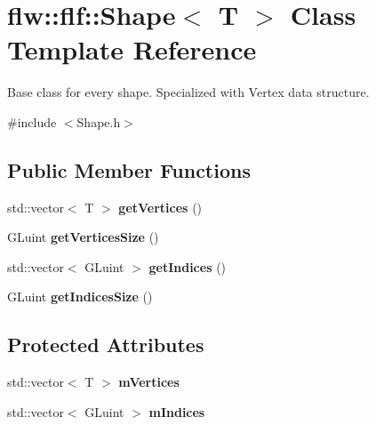 \hypertarget{classflw_1_1flf_1_1Shape}{}\section{flw\+:\+:flf\+:\+:Shape$<$ T $>$ Class Template Reference}
\label{classflw_1_1flf_1_1Shape}


Base class for every shape. Specialized with Vertex data structure.  




{\ttfamily \#include $<$Shape.\+h$>$}

\subsection*{Public Member Functions}
\begin{DoxyCompactItemize}
\item 
std\+::vector$<$ T $>$ {\bfseries get\+Vertices} ()\hypertarget{classflw_1_1flf_1_1Shape_a0cd6cc27bdc9ccd786413a6b76ffe7ba}{}\label{classflw_1_1flf_1_1Shape_a0cd6cc27bdc9ccd786413a6b76ffe7ba}

\item 
G\+Luint {\bfseries get\+Vertices\+Size} ()\hypertarget{classflw_1_1flf_1_1Shape_a787f47ca487ec7de0442209992f748f1}{}\label{classflw_1_1flf_1_1Shape_a787f47ca487ec7de0442209992f748f1}

\item 
std\+::vector$<$ G\+Luint $>$ {\bfseries get\+Indices} ()\hypertarget{classflw_1_1flf_1_1Shape_a42b437a6e28b9a5d795a0cd478071720}{}\label{classflw_1_1flf_1_1Shape_a42b437a6e28b9a5d795a0cd478071720}

\item 
G\+Luint {\bfseries get\+Indices\+Size} ()\hypertarget{classflw_1_1flf_1_1Shape_a4df4a07e5802c88c770c427b6fc1bd46}{}\label{classflw_1_1flf_1_1Shape_a4df4a07e5802c88c770c427b6fc1bd46}

\end{DoxyCompactItemize}
\subsection*{Protected Attributes}
\begin{DoxyCompactItemize}
\item 
std\+::vector$<$ T $>$ {\bfseries m\+Vertices}\hypertarget{classflw_1_1flf_1_1Shape_ac44a4ee206337c5959292c264a748d2d}{}\label{classflw_1_1flf_1_1Shape_ac44a4ee206337c5959292c264a748d2d}

\item 
std\+::vector$<$ G\+Luint $>$ {\bfseries m\+Indices}\hypertarget{classflw_1_1flf_1_1Shape_aa3544a00cc705c4eb3245c1328a52aae}{}\label{classflw_1_1flf_1_1Shape_aa3544a00cc705c4eb3245c1328a52aae}

\end{DoxyCompactItemize}


